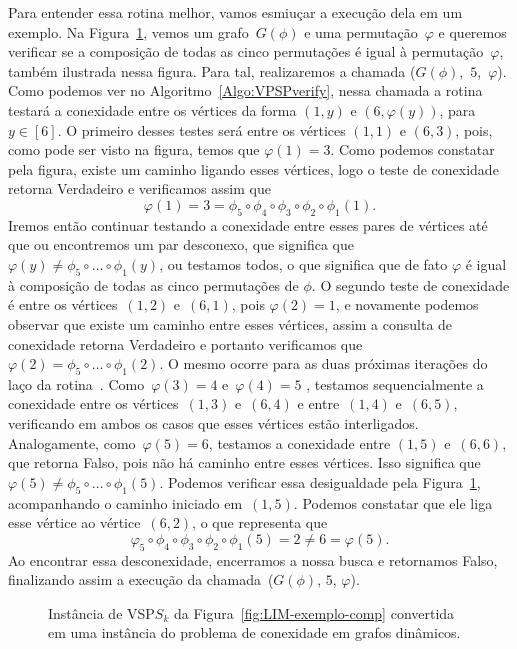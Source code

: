 Para entender essa rotina melhor, vamos esmiuçar a execução dela em um exemplo. Na Figura~\ref{fig:LIM-exemplo-verify}, vemos um grafo~$G(\phi)$ e uma permutação~$\varphi$ e queremos verificar se a composição de todas as cinco permutações é igual à permutação~$\varphi$, também ilustrada nessa figura. Para tal, realizaremos a chamada \mbox{\VPSPverify($G(\phi)$, $5$, $\varphi$)}. Como podemos ver no Algoritmo~\ref{Algo:VPSPverify}, nessa chamada a rotina \VPSPverify{} testará a conexidade entre os vértices da forma $(1,y)$ e $(6,\varphi(y))$, para $y\in [6]$. O primeiro desses testes será entre os vértices $(1,1)$ e $(6,3)$, pois, como pode ser visto na figura, temos que $\varphi(1) = 3$. Como podemos constatar pela figura, existe um caminho ligando esses vértices, logo o teste de conexidade retorna Verdadeiro e verificamos assim que
$$
\varphi(1) = 3 = \phi_5\circ \phi_4\circ \phi_3\circ \phi_2\circ \phi_1(1).
$$
Iremos então continuar testando a conexidade entre esses pares de vértices até que ou encontremos um par desconexo, que significa que~$\varphi(y) \neq \phi_5\circ\ldots\circ \phi_1(y)$, ou testamos todos, o que significa que de fato $\varphi$ é igual à composição de todas as cinco permutações de $\phi$. O segundo teste de conexidade é entre os vértices~$(1,2)$ e~$(6,1)$, pois $\varphi(2)=1$, e novamente podemos observar que existe um caminho entre esses vértices, assim a consulta de conexidade retorna Verdadeiro e portanto verificamos que $\varphi(2) = \phi_5\circ\ldots\circ \phi_1(2)$. O mesmo ocorre para as duas próximas iterações do laço da rotina~\VPSPverify{}. Como~$\varphi(3)=4$ e~$\varphi(4)=5$ , testamos sequencialmente a conexidade entre os vértices~$(1,3)$ e~$(6,4)$ e entre~$(1,4)$ e~$(6,5)$, verificando em ambos os casos que esses vértices estão interligados. Analogamente, como~$\varphi(5)=6$, testamos a conexidade entre $(1,5)$ e~$(6,6)$, que retorna Falso, pois não há caminho entre esses vértices. Isso significa que~$\varphi(5)\neq \phi_5\circ\ldots\circ \phi_1(5)$. Podemos verificar essa desigualdade pela Figura~\ref{fig:LIM-exemplo-verify}, acompanhando o caminho iniciado em~$(1,5)$. Podemos constatar que ele liga esse vértice ao vértice~$(6,2)$, o que representa que
$$
 \varphi_5\circ \phi_4\circ \phi_3\circ \phi_2\circ \phi_1(5) = 2 \neq 6 = \varphi(5).
$$
Ao encontrar essa desconexidade, encerramos a nossa busca e retornamos Falso, finalizando assim a execução da chamada~\VPSPverify($G(\phi)$, $5$, $\varphi$).

\begin{figure}[htb]
\centering
\scalebox{.85}{

}
\caption{Instância de VSP$S_k$ da Figura~\ref{fig:LIM-exemplo-comp} convertida em uma instância do problema de conexidade em grafos dinâmicos.}
\label{fig:LIM-exemplo-verify}
\end{figure}

